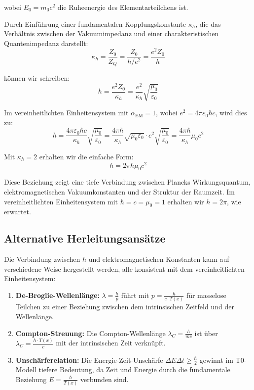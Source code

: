 \documentclass[12pt,a4paper]{article}
\newcommand{\Tfield}{T(x)}
\newcommand{\alphaEM}{\alpha_{\text{EM}}}
\begin{document}
	wobei \(E_0 = m_0 c^2\) die Ruheenergie des Elementarteilchens ist.
	
	Durch Einführung einer fundamentalen Kopplungskonstante \(\kappa_h\), die das Verhältnis zwischen der Vakuumimpedanz und einer charakteristischen Quantenimpedanz darstellt:
	\begin{equation}
		\kappa_h = \frac{Z_0}{Z_Q} = \frac{Z_0}{h/e^2} = \frac{e^2 Z_0}{h}
	\end{equation}
	
	können wir schreiben:
	\begin{equation}
		h = \frac{e^2 Z_0}{\kappa_h} = \frac{e^2}{\kappa_h} \sqrt{\frac{\mu_0}{\varepsilon_0}}
	\end{equation}
	
	Im vereinheitlichten Einheitensystem mit \(\alphaEM = 1\), wobei \(e^2 = 4\pi\varepsilon_0\hbar c\), wird dies zu:
	\begin{equation}
		h = \frac{4\pi\varepsilon_0\hbar c}{\kappa_h} \sqrt{\frac{\mu_0}{\varepsilon_0}} = \frac{4\pi\hbar}{\kappa_h} \sqrt{\mu_0\varepsilon_0} \cdot c^2 \sqrt{\frac{\mu_0}{\varepsilon_0}} = \frac{4\pi\hbar}{\kappa_h} \mu_0 c^2
	\end{equation}
	
	Mit \(\kappa_h = 2\) erhalten wir die einfache Form:
	\begin{equation}
		h = 2\pi\hbar \mu_0 c^2
	\end{equation}
	
	Diese Beziehung zeigt eine tiefe Verbindung zwischen Plancks Wirkungsquantum, elektromagnetischen Vakuumkonstanten und der Struktur der Raumzeit. Im vereinheitlichten Einheitensystem mit \(\hbar = c = \mu_0 = 1\) erhalten wir \(h = 2\pi\), wie erwartet.
	
	\subsection{Alternative Herleitungsansätze}
	\label{subsec:alternative_derivations}
	
	Die Verbindung zwischen \(h\) und elektromagnetischen Konstanten kann auf verschiedene Weise hergestellt werden, alle konsistent mit dem vereinheitlichten Einheitensystem:
	
	\begin{enumerate}
		\item \textbf{De-Broglie-Wellenlänge:} \(\lambda = \frac{h}{p}\) führt mit \(p = \frac{\hbar}{c \cdot \Tfield}\) für masselose Teilchen zu einer Beziehung zwischen dem intrinsischen Zeitfeld und der Wellenlänge.
		\item \textbf{Compton-Streuung:} Die Compton-Wellenlänge \(\lambda_C = \frac{h}{mc}\) ist über \(\lambda_C = \frac{h \cdot \Tfield}{c}\) mit der intrinsischen Zeit verknüpft.
		\item \textbf{Unschärferelation:} Die Energie-Zeit-Unschärfe \(\Delta E \Delta t \geq \frac{\hbar}{2}\) gewinnt im T0-Modell tiefere Bedeutung, da Zeit und Energie durch die fundamentale Beziehung \(E = \frac{\hbar}{\Tfield}\) verbunden sind.
	\end{enumerate}
	
\end{document}
